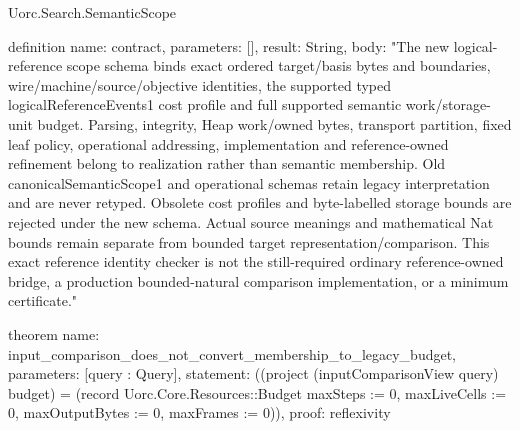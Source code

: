 \begin{lexlean}{Uorc.Search.SemanticScope}
\begin{semanticmodule}
definition{
  name: contract,
  parameters: [],
  result: String,
  body: "The new logical-reference scope schema binds exact ordered target/basis bytes and boundaries, wire/machine/source/objective identities, the supported typed logicalReferenceEvents1 cost profile and full supported semantic work/storage-unit budget. Parsing, integrity, Heap work/owned bytes, transport partition, fixed leaf policy, operational addressing, implementation and reference-owned refinement belong to realization rather than semantic membership. Old canonicalSemanticScope1 and operational schemas retain legacy interpretation and are never retyped. Obsolete cost profiles and byte-labelled storage bounds are rejected under the new schema. Actual source meanings and mathematical Nat bounds remain separate from bounded target representation/comparison. This exact reference identity checker is not the still-required ordinary reference-owned bridge, a production bounded-natural comparison implementation, or a minimum certificate."
}

theorem{
  name: input_comparison_does_not_convert_membership_to_legacy_budget,
  parameters: [query : Query],
  statement: ((project (inputComparisonView query) budget) = (record Uorc.Core.Resources::Budget {maxSteps := 0, maxLiveCells := 0, maxOutputBytes := 0, maxFrames := 0})),
  proof: reflexivity{}
}
\end{semanticmodule}
\end{lexlean}
